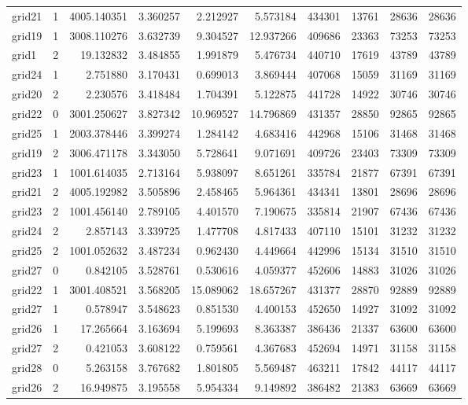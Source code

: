 \begin{longtable}{|l|r|r|r|r|r|r|r|r|r|}
grid21 & 1 & 4005.140351 & 3.360257 & 2.212927 & 5.573184 & 434301 & 13761 & 28636 & 28636 \\
grid19 & 1 & 3008.110276 & 3.632739 & 9.304527 & 12.937266 & 409686 & 23363 & 73253 & 73253 \\
grid1 & 2 & 19.132832 & 3.484855 & 1.991879 & 5.476734 & 440710 & 17619 & 43789 & 43789 \\
grid24 & 1 & 2.751880 & 3.170431 & 0.699013 & 3.869444 & 407068 & 15059 & 31169 & 31169 \\
grid20 & 2 & 2.230576 & 3.418484 & 1.704391 & 5.122875 & 441728 & 14922 & 30746 & 30746 \\
grid22 & 0 & 3001.250627 & 3.827342 & 10.969527 & 14.796869 & 431357 & 28850 & 92865 & 92865 \\
grid25 & 1 & 2003.378446 & 3.399274 & 1.284142 & 4.683416 & 442968 & 15106 & 31468 & 31468 \\
grid19 & 2 & 3006.471178 & 3.343050 & 5.728641 & 9.071691 & 409726 & 23403 & 73309 & 73309 \\
grid23 & 1 & 1001.614035 & 2.713164 & 5.938097 & 8.651261 & 335784 & 21877 & 67391 & 67391 \\
grid21 & 2 & 4005.192982 & 3.505896 & 2.458465 & 5.964361 & 434341 & 13801 & 28696 & 28696 \\
grid23 & 2 & 1001.456140 & 2.789105 & 4.401570 & 7.190675 & 335814 & 21907 & 67436 & 67436 \\
grid24 & 2 & 2.857143 & 3.339725 & 1.477708 & 4.817433 & 407110 & 15101 & 31232 & 31232 \\
grid25 & 2 & 1001.052632 & 3.487234 & 0.962430 & 4.449664 & 442996 & 15134 & 31510 & 31510 \\
grid27 & 0 & 0.842105 & 3.528761 & 0.530616 & 4.059377 & 452606 & 14883 & 31026 & 31026 \\
grid22 & 1 & 3001.408521 & 3.568205 & 15.089062 & 18.657267 & 431377 & 28870 & 92889 & 92889 \\
grid27 & 1 & 0.578947 & 3.548623 & 0.851530 & 4.400153 & 452650 & 14927 & 31092 & 31092 \\
grid26 & 1 & 17.265664 & 3.163694 & 5.199693 & 8.363387 & 386436 & 21337 & 63600 & 63600 \\
grid27 & 2 & 0.421053 & 3.608122 & 0.759561 & 4.367683 & 452694 & 14971 & 31158 & 31158 \\
grid28 & 0 & 5.263158 & 3.767682 & 1.801805 & 5.569487 & 463211 & 17842 & 44117 & 44117 \\
grid26 & 2 & 16.949875 & 3.195558 & 5.954334 & 9.149892 & 386482 & 21383 & 63669 & 63669 \\

\end{longtable}

